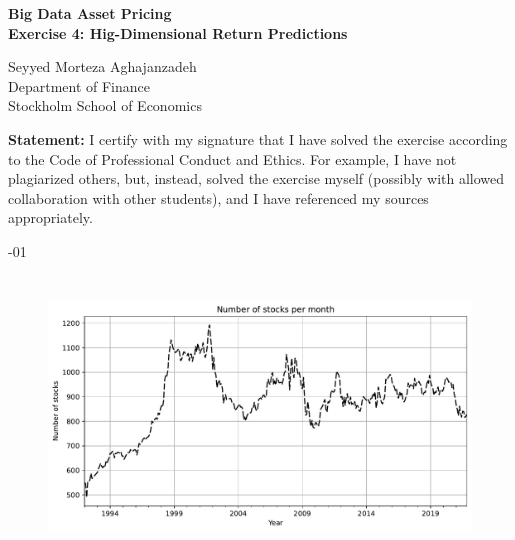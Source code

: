 \documentclass[hidelinks,12pt]{article}
\begin{document}
\begin{titlepage}
    \begin{center}
        \vspace*{1cm}
        
        
        
        \large
        \textbf{Big Data Asset Pricing \\ Exercise 4: Hig-Dimensional Return Predictions}
            
        
        \normalsize
        Seyyed Morteza Aghajanzadeh \\
        Department of Finance \\
        Stockholm School of Economics
        
        \vfill
        \normalsize
        \justifying
        \noindent
        \textbf{Statement:} I certify with my signature that I have solved the exercise according to the Code of Professional Conduct and Ethics. 
        For example, I have not plagiarized others, but, instead, solved the exercise myself (possibly with allowed collaboration with other students), and I have referenced my sources appropriately.

        \vfill
        
        \vspace{0.8cm}
            
        
        \vspace{0.8cm}
        \normalsize
        -01
            
    \end{center}
\end{titlepage}

\section{}

\begin{figure}[htbp]
    \centering
    \includegraphics[width=.95\textwidth]{out/1.pdf}
\end{figure}
\end{document}
